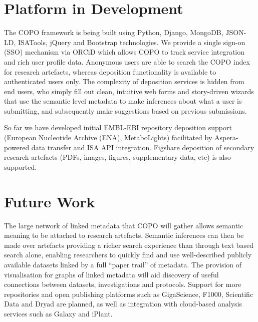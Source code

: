 \documentclass[runningheads,a4paper]{llncs}
\begin{document}
\vspace*{-0.1in}
\section{Platform in Development}
The COPO framework is being built using Python, Django, MongoDB,
JSON-LD, ISATools, jQuery and Bootstrap technologies. We provide a
single sign-on (SSO) mechanism via ORCiD which allows COPO to track
service integration and rich user profile data. Anonymous users are
able to search the COPO index for research artefacts, whereas
deposition functionality is available to authenticated users only. The
complexity of deposition services is hidden from end users, who simply
fill out clean, intuitive web forms and story-driven wizards that use
the semantic level metadata to make inferences about what a user is
submitting, and subsequently make suggestions based on previous
submissions.

So far we have developed initial EMBL-EBI repository deposition
support (European Nucleotide Archive (ENA), MetaboLights) facilitated
by Aspera-powered data transfer and ISA API integration. Figshare
deposition of secondary research artefacts (PDFs, images, figures,
supplementary data, etc) is also supported.

\vspace*{-0.1in}
\section{Future Work}
The large network of linked metadata that COPO will gather allows
semantic meaning to be attached to research artefacts. Semantic
inferences can then be made over artefacts providing a richer search
experience than through text based search alone, enabling researchers
to quickly find and use well-described publicly available datasets
linked by a full “paper trail” of metadata. The provision of
visualisation for graphs of linked metadata will aid discovery of
useful connections between datasets, investigations and
protocols. Support for more repositories and open publishing platforms
such as GigaScience, F1000, Scientific Data and Dryad are planned, as
well as integration with cloud-based analysis services such as Galaxy
and iPlant.
\end{document}
